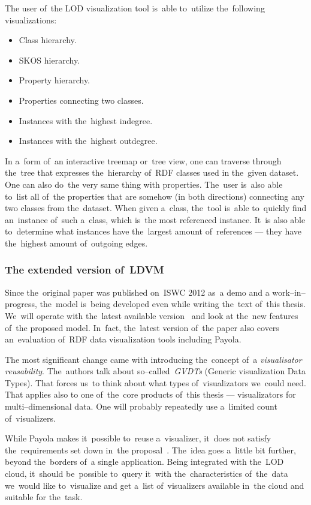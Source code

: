 The user of~the LOD visualization tool is~able to~utilize the~following 
visualizations:

\begin{itemize}
\item Class hierarchy.
\item SKOS hierarchy.
\item Property hierarchy.
\item Properties connecting two classes.
\item Instances with the~highest indegree.
\item Instances with the~highest outdegree.
\end{itemize}

In a~form of~an interactive treemap or~tree view, one 
can traverse through the~tree that expresses the~hierarchy of~RDF classes used 
in the~given dataset. One can also do~the very same thing with properties. The~user is~also able to~list all of~the properties that are somehow (in both directions)
connecting any two classes from the~dataset. When given a~class, the~tool is~able to~quickly find an~instance of~such a~class, which is~the most referenced
instance. It~is also able to~determine what instances have the~largest amount of~references
--- they have the~highest amount of~outgoing
edges.

\subsubsection{The extended version of~LDVM}
Since the~original paper was published on~ISWC 2012 as~a demo and a
work--in--progress, the~model is~being developed even while writing the~text of~this thesis. We~will operate with the~latest available version~\cite{ldvm2} and look 
at the~new features of~the proposed model. In~fact, the~latest version of~the 
paper also covers an~evaluation of~RDF data visualization tools including 
Payola.

The most significant change came with introducing the~concept of~a \emph{visualisator 
reusability}. The~authors talk about so--called~\emph{GVDTs} (Generic visualization Data Types).
That forces us~to think about what types of~visualizators we~could need. That applies also to
one of~the~core products of~this thesis --- visualizators for multi--dimensional data.
One will probably repeatedly use a~limited count of~visualizers.

While Payola makes it~possible to~reuse a~visualizer, it~does not satisfy the~requirements set down in~the proposal~\cite{ldvm2}. The~idea goes a~little bit 
further, beyond the~borders of~a single application. Being integrated with the~LOD cloud, it~should be~possible to~query it~with the~characteristics of~the~data we~would like to~visualize and get a~list of~visualizers 
available in~the cloud and suitable for the~task.


